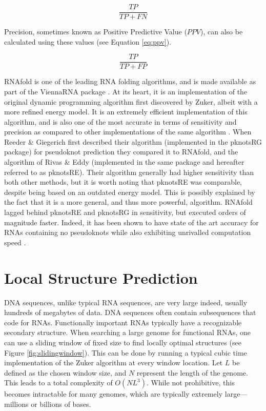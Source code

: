 \documentclass{cshonours}
\begin{document}
\begin{equation} \label{eq:tpr}
 \frac{TP}{TP + FN}
\end{equation}

Precision, sometimes known as Positive Predictive Value ($PPV$), can also be calculated
using these values (see Equation \ref{eq:ppv}).


\begin{equation} \label{eq:ppv}
 \frac{TP}{TP + FP}
\end{equation}


RNAfold \cite{lorenz2011viennarna} is one of the leading RNA folding algorithms, and is made available
as part of the ViennaRNA package \cite{lorenz2011viennarna}. At its heart, it is an implementation
of the original dynamic programming algorithm first discovered by Zuker, albeit
with a more refined energy model. It is an extremely efficient implementation of
this algorithm, and is also one of the most accurate in terms of sensitivity and
precision as compared to other implementations of the same algorithm \cite{lorenz2011viennarna}. When
Reeder \& Giegerich \cite{reeder2004design} first described their algorithm (implemented in the pknotsRG package) for pseudoknot prediction they compared it to RNAfold, and the
algorithm of Rivas \& Eddy \cite{rivas1999dynamic} (implemented in the same package and hereafter
referred to as pknotsRE). Their algorithm generally had higher sensitivity than
both other methods, but it is worth noting that pknotsRE was comparable, despite being based on an outdated energy model. This is possibly explained by
the fact that it is a more general, and thus more powerful, algorithm. RNAfold
lagged behind pknotsRE and pknotsRG in sensitivity, but executed orders of magnitude faster. Indeed, it has been shown to have state of the art accuracy for RNAs containing
no pseudoknots while also exhibiting unrivalled computation speed \cite{lorenz2011viennarna}.


\section{Local Structure Prediction}
\label{sec:locopt}


DNA sequences, unlike typical RNA sequences, are very large indeed, usually hundreds of megabytes of data. DNA sequences often contain subsequences that code for RNAs. Functionally important RNAs typically have
a recognizable secondary structure. When searching a large genome for functional RNAs, one can use a sliding window of fixed size to find locally optimal
structures (see Figure \ref{fig:slidingwindow}). This can be done by running a typical cubic time implementation of the Zuker algorithm at every window location. Let $L$ be defined as the chosen
window size, and $N$ represent the length of the genome. This leads to a total complexity of $O(NL^3)$. While not prohibitive, this becomes intractable for many
genomes, which are typically extremely large---millions or billions of bases. 
\end{document}
